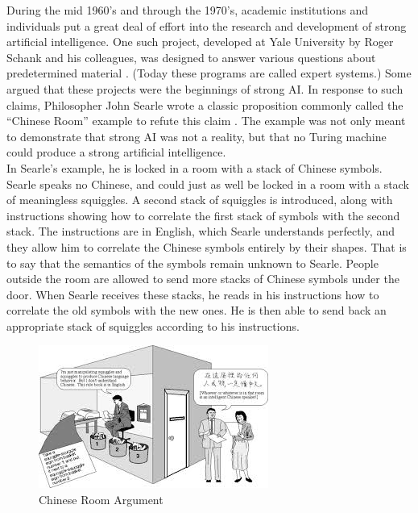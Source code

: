    During the mid 1960’s and through the 1970’s, academic institutions and
individuals put a great deal of effort into the research and development of strong artificial
intelligence. One such project, developed at Yale University by Roger Schank and his
colleagues, was designed to answer various questions about predetermined material
\cite{six}. (Today these programs are called expert systems.) Some argued that
these projects were the beginnings of strong AI. In response to such claims, Philosopher
John Searle wrote a classic proposition commonly called the “Chinese Room” example to
refute this claim \cite{six}. The example was not only meant to demonstrate that strong AI
was not a reality, but that no Turing machine could produce a strong artificial
intelligence.\\
In Searle’s example, he is locked in a room with a stack of Chinese symbols.
Searle speaks no Chinese, and could just as well be locked in a room with a stack of
meaningless squiggles. A second stack of squiggles is introduced, along with instructions
showing how to correlate the first stack of symbols with the second stack. The
instructions are in English, which Searle understands perfectly, and they allow him to
correlate the Chinese symbols entirely by their shapes. That is to say that the semantics
of the symbols remain unknown to Searle. People outside the room are allowed to send
more stacks of Chinese symbols under the door. When Searle receives these stacks, he reads in his instructions how to correlate the old symbols with the new ones. He is then
able to send back an appropriate stack of squiggles according to his instructions.\\

\begin{figure}[H]
    \centering
    \includegraphics{images/chinese.jpg}
    \caption{Chinese Room Argument}
    \label{fig:my_label}
\end{figure}

